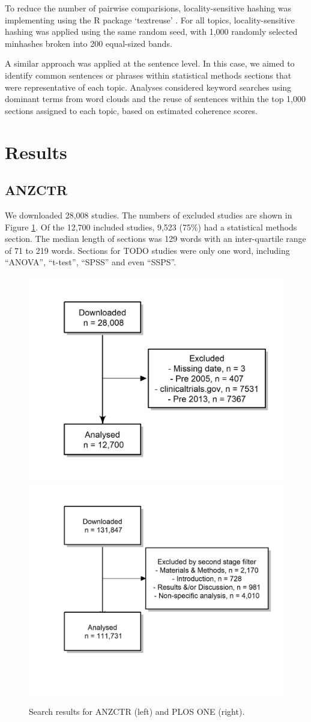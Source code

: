 \documentclass[12pt]{article}
\begin{document}
To reduce the number of pairwise comparisions, locality-sensitive hashing was implementing using the R package `textreuse' \citep{textreuseR}. For all topics, locality-sensitive hashing was applied using the same random seed, 
with 1,000 randomly selected minhashes broken into 200 equal-sized bands. 

A similar approach was applied at the sentence level. In this case, we aimed to identify common sentences or phrases within statistical methods sections that were representative of each topic. 
Analyses considered keyword searches using dominant terms from word clouds and the reuse of sentences within the top 1,000 sections assigned to each topic, based on estimated coherence scores. 

\clearpage

\section{Results}\label{results}

\subsection{ANZCTR}

We downloaded 28,008 studies. The numbers of excluded studies are shown
in Figure \ref{fig:consort-diagrams}. Of the 12,700 included studies,
9,523 (75\%) had a statistical methods section. The median length of
sections was 129 words with an inter-quartile range of 71 to 219 words. 
Sections for TODO studies were only one word, including ``ANOVA'',
``t-test'', ``SPSS'' and even ``SSPS''.

\begin{figure}[htbp]
\centering 
\includegraphics[width=0.49\linewidth]{figures/excluded_anzctr_missing}  \includegraphics[width=0.49\linewidth]{figures/excluded_plosone}
\caption{\label{fig:consort-diagrams}Search results for ANZCTR (left) and PLOS ONE (right).}
\end{figure}
\end{document}
